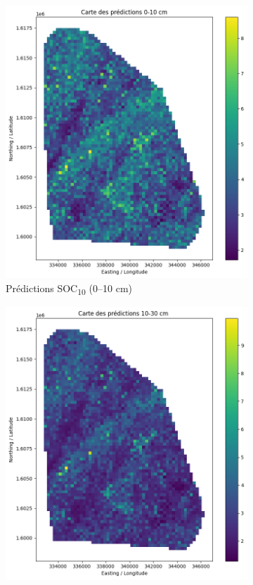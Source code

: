 \documentclass[12pt,a4paper,oneside]{report}
\begin{document}
\begin{figure}[h!]
    \centering
    \begin{subfigure}[b]{0.48\textwidth}
        \includegraphics[width=\linewidth]{images/soc10_map.png}
        \caption{Prédictions SOC\textsubscript{10} (0--10 cm)}
    \end{subfigure}
    \hfill
    \begin{subfigure}[b]{0.48\textwidth}
        \includegraphics[width=\linewidth]{images/soc30_map.png}

\end{subfigure}
\end{figure}
\end{document}
